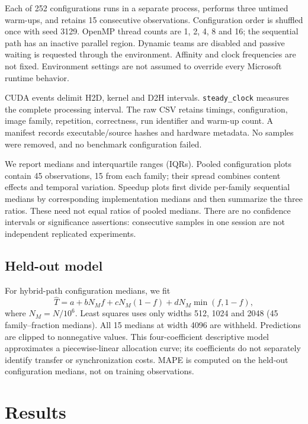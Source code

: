 \documentclass[conference]{IEEEtran}
\begin{document}
Each of 252 configurations runs in a separate process, performs three untimed warm-ups, and retains 15 consecutive observations. Configuration order is shuffled once with seed 3129. OpenMP thread counts are 1, 2, 4, 8 and 16; the sequential path has an inactive parallel region. Dynamic teams are disabled and passive waiting is requested through the environment. Affinity and clock frequencies are not fixed. Environment settings are not assumed to override every Microsoft runtime behavior.

CUDA events delimit H2D, kernel and D2H intervals. \texttt{steady\_clock} measures the complete processing interval. The raw CSV retains timings, configuration, image family, repetition, correctness, run identifier and warm-up count. A manifest records executable/source hashes and hardware metadata. No samples were removed, and no benchmark configuration failed.

We report medians and interquartile ranges (IQRs). Pooled configuration plots contain 45 observations, 15 from each family; their spread combines content effects and temporal variation. Speedup plots first divide per-family sequential medians by corresponding implementation medians and then summarize the three ratios. These need not equal ratios of pooled medians. There are no confidence intervals or significance assertions: consecutive samples in one session are not independent replicated experiments.

\subsection{Held-out model}
For hybrid-path configuration medians, we fit
\begin{equation}
\widehat T=a+bN_Mf+cN_M(1-f)+dN_M\min(f,1-f),
\end{equation}
where $N_M=N/10^6$. Least squares uses only widths 512, 1024 and 2048 (45 family--fraction medians). All 15 medians at width 4096 are withheld. Predictions are clipped to nonnegative values. This four-coefficient descriptive model approximates a piecewise-linear allocation curve; its coefficients do not separately identify transfer or synchronization costs. MAPE is computed on the held-out configuration medians, not on training observations.

\section{Results}
\end{document}
